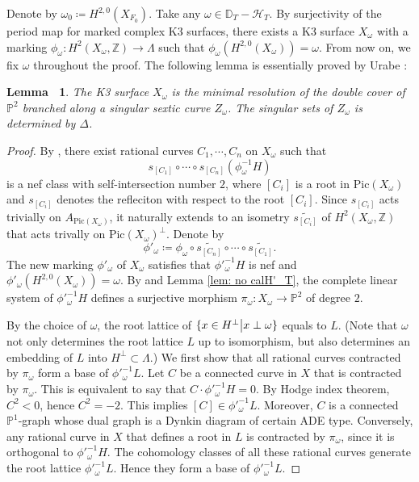 \documentclass[12pt,reqno,a4paper]{amsart}
\newtheorem{lem}[thm]{Lemma~}
\theoremstyle{remark}
\theoremstyle{definition}
\newcommand{\ZZ}{\mathbb{Z}}
\newcommand{\PP}{\mathbb{P}}
\newcommand{\DD}{\mathbb{D}}
\newcommand{\calH}{\mathcal{H}}
\newcommand{\Pic}{\mathrm{Pic}}
\begin{document}
Denote by $\omega_0\coloneqq H^{2,0}(X_{F_0})$.
Take any $\omega\in\DD_T-\calH_T$.
By surjectivity of the period map for marked complex K3 surfaces, there exists a K3 surface $X_\omega$ with a marking $\phi_\omega\colon H^2(X_\omega,\ZZ)\to \Lambda$ such that $\phi_\omega(H^{2,0}(X_\omega))=\omega$.
From now on, we fix $\omega$ throughout the proof.
The following lemma is essentially proved by Urabe \cite[Theorem 1.16]{urabe1988combinations}:
\begin{lem}
\label{lem: X_omega determines Z(F)}
    The K3 surface $X_\omega$ is the minimal resolution of the double cover of $\PP^2$ branched along a singular sextic curve $Z_\omega$.
    The singular sets of $Z_\omega$ is determined by $\Delta$.
\end{lem}
\begin{proof}
    By \cite[Chapter 8, \S 2, Corollary 2.9]{huybrechts2016lectures}, there exist rational curves $C_1,\cdots,C_n$ on $X_\omega$ such that 
    \begin{equation*}
        s_{[C_1]}\circ\cdots\circ s_{[C_n]}(\phi_\omega^{-1}H)
    \end{equation*}
    is a nef class with self-intersection number $2$, where $[C_i]$ is a root in $\Pic(X_\omega)$ and $s_{[C_i]}$ denotes the refleciton with respect to the root $[C_i]$.
    Since $s_{[C_i]}$ acts trivially on $A_{\Pic(X_\omega)}$, it naturally extends to an isometry $\widetilde{s_{[C_i]}}$ of $H^2(X_\omega,\ZZ)$ that acts trivally on $\Pic(X_\omega)^\perp$. 
    Denote by 
    \begin{equation*}
        \phi'_\omega\coloneqq \phi_\omega\circ \widetilde{s_{[C_n]}}\circ\cdots\circ \widetilde{s_{[C_1]}}.
    \end{equation*}
    The new marking $\phi'_\omega$ of $X_\omega$ satisfies that $\phi'^{-1}_\omega H$ is nef and $\phi'_\omega(H^{2,0}(X_\omega))=\omega$.
    By \cite[Proposition 1.7]{urabe1988combinations} and Lemma \ref{lem: no calH'_T}, the complete linear system of $\phi'^{-1}_\omega H$ defines a surjective morphism $\pi_\omega\colon X_\omega\to \PP^2$ of degree $2$.

    By the choice of $\omega$, the root lattice of $\{x\in H^\perp \big{|} x \perp \omega \}$ equals to $L$.  
    (Note that $\omega$ not only determines the root lattice $L$ up to isomorphism, but also determines an embedding of $L$ into $H^\perp\subset\Lambda$.)
    We first show that all rational curves contracted by $\pi_\omega$ form a base of $\phi'^{-1}_\omega L$.
    Let $C$ be a connected curve in $X$ that is contracted by $\pi_\omega$.
    This is equivalent to say that $C\cdot \phi'^{-1}_\omega H = 0$.
    By Hodge index theorem, $C^2<0$, hence $C^2=-2$. This implies $[C]\in \phi'^{-1}_\omega L$.
    Moreover, $C$ is a connected $\PP^1$-graph whose dual graph is a Dynkin diagram of certain ADE type.
    Conversely, any rational curve in $X$ that defines a root in $L$ is contracted by $\pi_\omega$, since it is orthogonal to $\phi'^{-1}_\omega H$.
    The cohomology classes of all these rational curves generate the root lattice $\phi'^{-1}_\omega L$.
    Hence they form a base of $\phi'^{-1}_\omega L$.


\end{proof}
\end{document}
